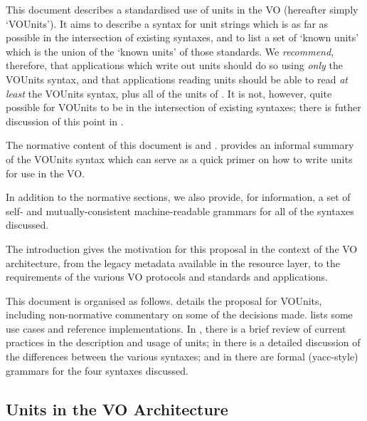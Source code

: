 \documentclass[11pt,a4paper]{ivoa}
\begin{document}
This document describes a standardised use of units in the VO
(hereafter simply `VOUnits').  It aims to describe a syntax for unit
strings which is as far as possible in the intersection of existing
syntaxes, and to list a set of `known units' which is
the union of the `known units' of those standards.
We \emph{recommend}, therefore, that applications which write out
units should do so using \emph{only} the VOUnits syntax, and that
applications reading units should be able to read \emph{at least} the
VOUnits syntax, plus all of the units of .
It is not, however, quite possible for VOUnits to be in the
intersection of existing syntaxes; there is futher discussion of this
point in .

The normative content of this document is  and .
 provides an informal summary of the VOUnits
syntax which can serve as a quick primer on how to write units for use
in the VO.

In addition to the normative sections,
we also provide, for information, a set of self- and mutually-consistent
machine-readable grammars for all of the syntaxes discussed.

The introduction gives the motivation for
this proposal in the context of the VO architecture, from the legacy
metadata available in the resource layer, to the requirements of the various
VO protocols and standards and applications.

This document is organised as follows. 
details the proposal for VOUnits, including non-normative
commentary on some of the decisions made.
 lists some use cases and reference implementations.
In ,
there is a brief review of current practices in the description and
usage of units; in  there is a detailed
discussion of the differences between the various syntaxes; and
in  there are formal (yacc-style) grammars for
the four syntaxes discussed.

\subsection{Units in the VO Architecture}

\renewcommand{\topfraction}{.85}
\renewcommand{\bottomfraction}{.7}
\renewcommand{\textfraction}{.15}
\renewcommand{\floatpagefraction}{.66}
\end{document}
